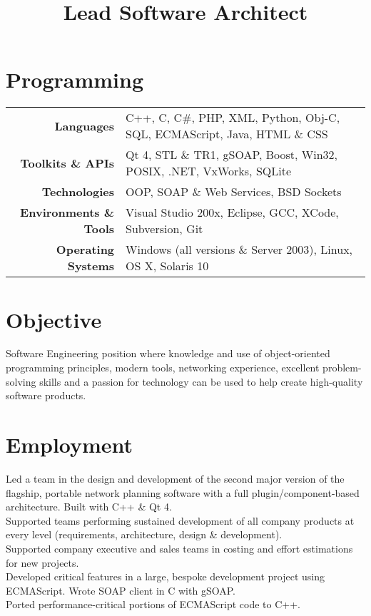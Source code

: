 \documentclass{resume}
\begin{document}
\address{22 Morse Close\\Chippenham\\SN15 3FY\\UK}
\address{lee@leegent.net\\+44 7748 183797}

\begin{resume}

\section{Programming}
{\small
\begin{tabular}{rl}
\textbf{Languages} & C++, C, C\#, PHP, XML, Python, Obj-C, SQL, ECMAScript, Java, HTML \& CSS \\
\textbf{Toolkits \& APIs} & Qt 4, STL \& TR1, gSOAP, Boost, Win32, POSIX, .NET, VxWorks, SQLite \\
\textbf{Technologies} & OOP, SOAP \& Web Services, BSD Sockets \\
\textbf{Environments \& Tools} & Visual Studio 200x, Eclipse, GCC, XCode, Subversion, Git \\
\textbf{Operating Systems} & Windows (all versions \& Server 2003), Linux, OS X, Solaris 10
\end{tabular}
}
\section{Objective}
Software Engineering position where knowledge and use of object-oriented programming principles, modern tools, networking experience, excellent problem-solving skills and a passion for technology can be used to help create high-quality software products.

\section{Employment}

\title{\bf{Lead Software Architect}}
\begin{position}
Led a team in the design and development of the second major version of the flagship, portable network planning software with a full plugin/component-based architecture.  Built with C++ \& Qt 4.\vspace{1mm}\\
Supported teams performing sustained development of all company products at every level (requirements, architecture, design \& development).\vspace{1mm}\\
Supported company executive and sales teams in costing and effort estimations for new projects.\vspace{1mm}\\
Developed critical features in a large, bespoke development project using ECMAScript.  Wrote SOAP client in C with gSOAP.\vspace{1mm}\\
Ported performance-critical portions of ECMAScript code to C++.
\end{position}


\end{resume}
\end{document}
